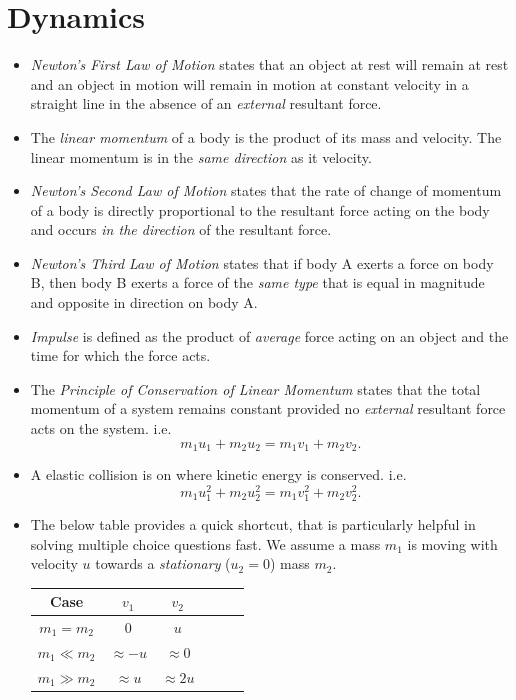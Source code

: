 \documentclass[oneside]{book}
\begin{document}
\chapter{Dynamics}
\begin{itemize}
    \item \emph{Newton's First Law of Motion} states that an object at rest will remain at rest and an object in motion will remain in motion at constant velocity in a straight line in the absence of an \emph{external} resultant force.
    \item The \emph{linear momentum} of a body is the product of its mass and velocity. The linear momentum is in the \emph{same direction} as it velocity.
    \item \emph{Newton's Second Law of Motion} states that the rate of change of momentum of a body is directly proportional to the resultant force acting on the body and occurs \emph{in the direction} of the resultant force.
    \item \emph{Newton's Third Law of Motion} states that if body A exerts a force on body B, then body B exerts a force of the \emph{same type} that is equal in magnitude and opposite in direction on body A.
    \item \emph{Impulse} is defined as the product of \emph{average} force acting on an object and the time for which the force acts.
    \item The \emph{Principle of Conservation of Linear Momentum} states that the total momentum of a system remains constant provided no \emph{external} resultant force acts on the system. i.e.
    \[m_1u_1+m_2u_2=m_1v_1+m_2v_2.\]
    \item A elastic collision is on where kinetic energy is conserved. i.e.
    \[m_1u_1^2+m_2u_2^2=m_1v_1^2+m_2v_2^2.\]
    \item The below table provides a quick shortcut, that is particularly helpful in solving multiple choice questions fast. We assume a mass \(m_1\) is moving with velocity \(u\) towards a \emph{stationary} (\(u_2=0\)) mass \(m_2\).
    \begin{table}[H]
        \centering
        \begin{tabular}{ScScSc}
            \toprule 
            Case & \(v_1\) & \(v_2\)\\
            \midrule
            \(m_1=m_2\) & \(0\) & \(u\)\\
            \(m_1\ll m_2\) & \(\approx -u\) & \(\approx 0\)\\
            \(m_1\gg m_2\) & \(\approx u\) & \(\approx 2u\)\\

\end{tabular}
\end{table}
\end{itemize}
\end{document}
